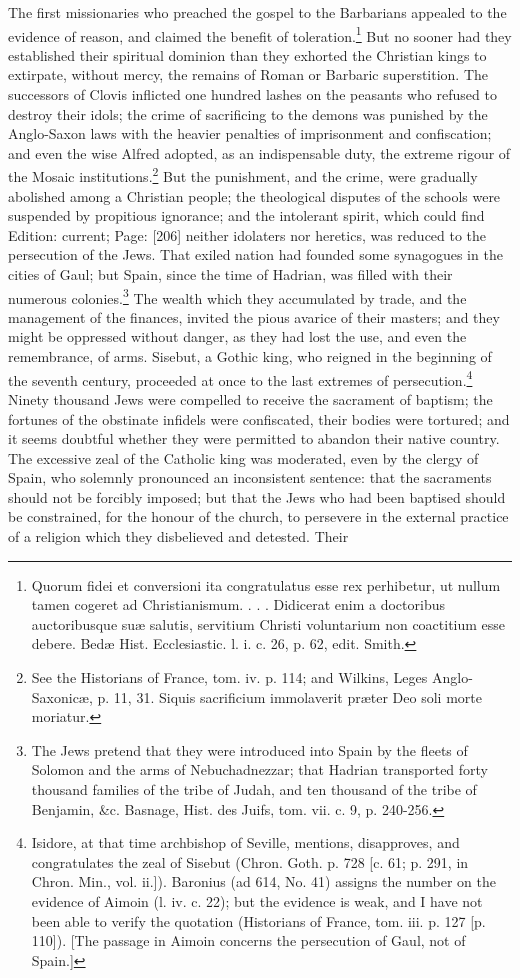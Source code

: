 The first missionaries who preached the gospel to the Barbarians appealed to the evidence of reason, and claimed the benefit of toleration.\footnote{Quorum fidei et conversioni ita congratulatus esse rex perhibetur, ut nullum tamen cogeret ad Christianismum. . . . Didicerat enim a doctoribus auctoribusque suæ salutis, servitium Christi voluntarium non coactitium esse debere. Bedæ Hist. Ecclesiastic. l. i. c. 26, p. 62, edit. Smith.} But no sooner had they established their spiritual dominion than they exhorted the Christian kings to extirpate, without mercy, the remains of Roman or Barbaric superstition. The successors of Clovis inflicted one hundred lashes on the peasants who refused to destroy their idols; the crime of sacrificing to the demons was punished by the Anglo-Saxon laws with the heavier penalties of imprisonment and confiscation; and even the wise Alfred adopted, as an indispensable duty, the extreme rigour of the Mosaic institutions.\footnote{See the Historians of France, tom. iv. p. 114; and Wilkins, Leges Anglo-Saxonicæ, p. 11, 31. Siquis sacrificium immolaverit præter Deo soli morte moriatur.} But the punishment, and the crime, were gradually abolished among a Christian people; the theological disputes of the schools were suspended by propitious ignorance; and the intolerant spirit, which could find Edition: current; Page: [206] neither idolaters nor heretics, was reduced to the persecution of the Jews. That exiled nation had founded some synagogues in the cities of Gaul; but Spain, since the time of Hadrian, was filled with their numerous colonies.\footnote{The Jews pretend that they were introduced into Spain by the fleets of Solomon and the arms of Nebuchadnezzar; that Hadrian transported forty thousand families of the tribe of Judah, and ten thousand of the tribe of Benjamin, \&c. Basnage, Hist. des Juifs, tom. vii. c. 9, p. 240-256.} The wealth which they accumulated by trade, and the management of the finances, invited the pious avarice of their masters; and they might be oppressed without danger, as they had lost the use, and even the remembrance, of arms. Sisebut, a Gothic king, who reigned in the beginning of the seventh century, proceeded at once to the last extremes of persecution.\footnote{Isidore, at that time archbishop of Seville, mentions, disapproves, and congratulates the zeal of Sisebut (Chron. Goth. p. 728 [c. 61; p. 291, in Chron. Min., vol. ii.]). Baronius (ad 614, No. 41) assigns the number on the evidence of Aimoin (l. iv. c. 22); but the evidence is weak, and I have not been able to verify the quotation (Historians of France, tom. iii. p. 127 [p. 110]). [The passage in Aimoin concerns the persecution of Gaul, not of Spain.]} Ninety thousand Jews were compelled to receive the sacrament of baptism; the fortunes of the obstinate infidels were confiscated, their bodies were tortured; and it seems doubtful whether they were permitted to abandon their native country. The excessive zeal of the Catholic king was moderated, even by the clergy of Spain, who solemnly pronounced an inconsistent sentence: that the sacraments should not be forcibly imposed; but that the Jews who had been baptised should be constrained, for the honour of the church, to persevere in the external practice of a religion which they disbelieved and detested. Their 